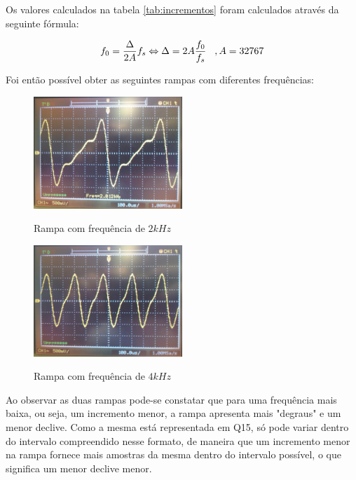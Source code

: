 \documentclass[11pt]{article}
\begin{document}
Os valores calculados na tabela \ref{tab:incrementos} foram calculados através da seguinte fórmula:

\begin{equation}
 f_{0}= \frac{\Delta}{2A}f_{s} \Leftrightarrow \Delta= 2A\frac{f_{0}}{f_{s}} \hspace{3 mm}, A=32767
\end{equation}

Foi então possível obter as seguintes rampas com diferentes frequências:


\begin{figure}[H]
	\centering
	\includegraphics[width=0.5\textwidth]{./P1_2kHz}~\\
	\caption{Rampa com frequência de $ 2 kHz $}
\end{figure}


\begin{figure}[H]
	\centering
	\includegraphics[width=0.5\textwidth]{./P1_4kHz}~\\
	\caption{Rampa com frequência de $ 4 kHz $}
\end{figure}
Ao observar as duas rampas pode-se constatar que para uma frequência mais baixa, ou seja, um incremento menor, a rampa apresenta mais "degraus" e um menor declive. Como a mesma está representada em Q15, só pode variar dentro do intervalo compreendido nesse formato, de maneira que um incremento menor na rampa fornece mais amostras da mesma dentro do intervalo possível, o que significa um menor declive menor.
\vspace{2 mm}
\end{document}

